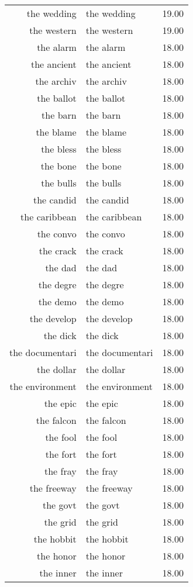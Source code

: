 \begin{table}[ht]
\begin{tabular}{rlr}
  the wedding & the wedding & 19.00 \\ 
  the western & the western & 19.00 \\ 
  the alarm & the alarm & 18.00 \\ 
  the ancient & the ancient & 18.00 \\ 
  the archiv & the archiv & 18.00 \\ 
  the ballot & the ballot & 18.00 \\ 
  the barn & the barn & 18.00 \\ 
  the blame & the blame & 18.00 \\ 
  the bless & the bless & 18.00 \\ 
  the bone & the bone & 18.00 \\ 
  the bulls & the bulls & 18.00 \\ 
  the candid & the candid & 18.00 \\ 
  the caribbean & the caribbean & 18.00 \\ 
  the convo & the convo & 18.00 \\ 
  the crack & the crack & 18.00 \\ 
  the dad & the dad & 18.00 \\ 
  the degre & the degre & 18.00 \\ 
  the demo & the demo & 18.00 \\ 
  the develop & the develop & 18.00 \\ 
  the dick & the dick & 18.00 \\ 
  the documentari & the documentari & 18.00 \\ 
  the dollar & the dollar & 18.00 \\ 
  the environment & the environment & 18.00 \\ 
  the epic & the epic & 18.00 \\ 
  the falcon & the falcon & 18.00 \\ 
  the fool & the fool & 18.00 \\ 
  the fort & the fort & 18.00 \\ 
  the fray & the fray & 18.00 \\ 
  the freeway & the freeway & 18.00 \\ 
  the govt & the govt & 18.00 \\ 
  the grid & the grid & 18.00 \\ 
  the hobbit & the hobbit & 18.00 \\ 
  the honor & the honor & 18.00 \\ 
  the inner & the inner & 18.00 \\ 

\end{tabular}
\end{table}
